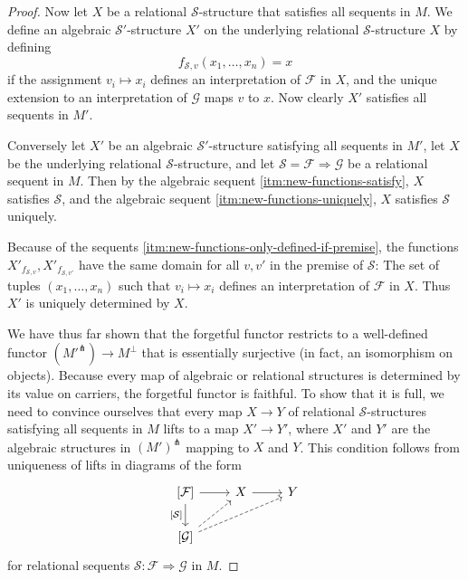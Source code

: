 \documentclass[a4paper]{article}
\theoremstyle{remark}
\theoremstyle{definition}
\begin{document}
\begin{proof}
  Now let $X$ be a relational $\mathcal{S}$-structure that satisfies all sequents in $M$.
  We define an algebraic $\mathcal{S}'$-structure $X'$ on the underlying relational $\mathcal{S}$-structure $X$ by defining
  \begin{equation}
    f_{\mathcal{S}, v}(x_1, \dots, x_n) = x
  \end{equation}
  if the assignment $v_i \mapsto x_i$ defines an interpretation of $\mathcal{F}$ in $X$, and the unique extension to an interpretation of $\mathcal{G}$ maps $v$ to $x$.
  Now clearly $X'$ satisfies all sequents in $M'$.
  
  Conversely let $X'$ be an algebraic $\mathcal{S}'$-structure satisfying all sequents in $M'$, let $X$ be the underlying relational $\mathcal{S}$-structure, and let $\mathcal{S} = \mathcal{F} \Rightarrow \mathcal{G}$ be a relational sequent in $M$.
  Then by the algebraic sequent \ref{itm:new-functions-satisfy}, $X$ satisfies $\mathcal{S}$, and the algebraic sequent \ref{itm:new-functions-uniquely}, $X$ satisfies $\mathcal{S}$ uniquely.

  Because of the sequents \ref{itm:new-functions-only-defined-if-premise}, the functions $X'_{f_{\mathcal{S}, v}}, X'_{f_{\mathcal{S}, v'}}$ have the same domain for all $v, v'$ in the premise of $\mathcal{S}$:
  The set of tuples $(x_1, \dots, x_n)$ such that $v_i \mapsto x_i$ defines an interpretation of $\mathcal{F}$ in $X$.
  Thus $X'$ is uniquely determined by $X$.

  We have thus far shown that the forgetful functor restricts to a well-defined functor $(M'^\pitchfork) \rightarrow M^\perp$ that is essentially surjective (in fact, an isomorphism on objects).
  Because every map of algebraic or relational structures is determined by its value on carriers, the forgetful functor is faithful.
  To show that it is full, we need to convince ourselves that every map $X \rightarrow Y$ of relational $\mathcal{S}$-structures satisfying all sequents in $M$ lifts to a map $X' \rightarrow Y'$, where $X'$ and $Y'$ are the algebraic structures in $(M')^\pitchfork$ mapping to $X$ and $Y$.
  This condition follows from uniqueness of lifts in diagrams of the form
  \begin{equation}
    \begin{tikzcd}
      \left[ \mathcal{F} \right] \arrow[d, "{[\mathcal{S}]}"'] \arrow[r] & X \arrow[r] & Y \\
      \left[ \mathcal{G} \right] \arrow[ur, dashed] \arrow[urr, dashed]
    \end{tikzcd}
  \end{equation}
  for relational sequents $\mathcal{S} : \mathcal{F} \Rightarrow \mathcal{G}$ in $M$.
\end{proof}



\end{document}
